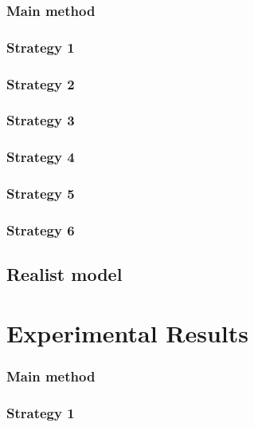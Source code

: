 \documentclass[a4paper,10pt]{article}
\begin{document}
\subsubsection{Main method}


\subsubsection{Strategy 1}


\subsubsection{Strategy 2}


\subsubsection{Strategy 3}


\subsubsection{Strategy 4}


\subsubsection{Strategy 5}




\subsubsection{Strategy 6}



\subsection{Realist model} \label{realistic}


\newpage 

\section{Experimental Results} \label{Chapter4}

\subsubsection{Main method}


\subsubsection{Strategy 1}
\end{document}
